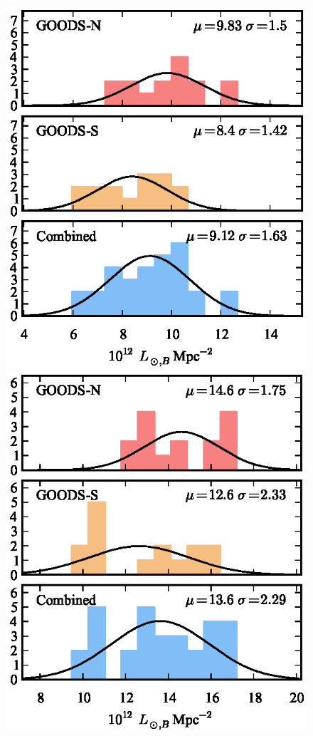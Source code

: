 \begin{figure}[p]
\includegraphics{figures/clrate/bkghist_all_G.eps}%
\includegraphics{figures/clrate/bkghist_all_A.eps}

\end{figure}
